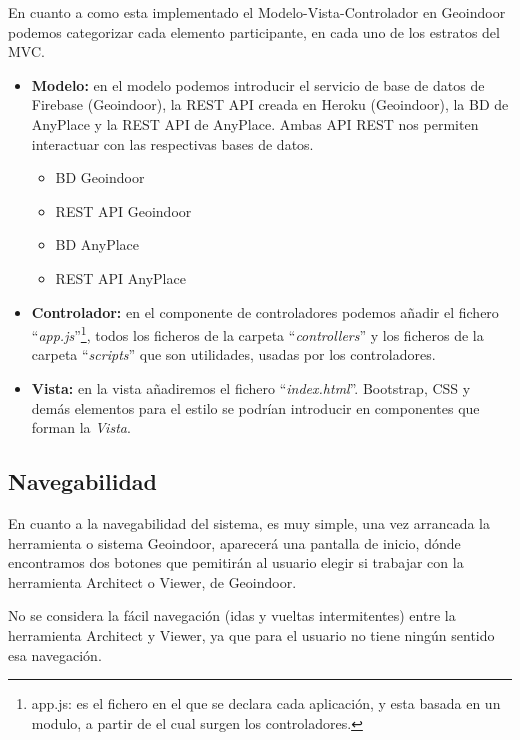 En cuanto a como esta implementado el Modelo-Vista-Controlador en Geoindoor podemos categorizar cada elemento participante, en cada uno de los estratos del MVC.

\begin{itemize}
	\item \textbf{Modelo:} en el modelo podemos introducir el servicio de base de datos de Firebase (Geoindoor), la REST API creada en Heroku (Geoindoor), la BD de AnyPlace y la REST API de AnyPlace. Ambas API REST nos permiten interactuar con las respectivas bases de datos.
	\begin{itemize}
		\item BD Geoindoor
		\item REST API Geoindoor 
		\item BD AnyPlace
		\item REST API AnyPlace 
	\end{itemize}
	\item \textbf{Controlador:} en el componente de controladores podemos añadir el fichero ``\textit{app.js}''\footnote{app.js: es el fichero en el que se declara cada aplicación, y esta basada en un modulo, a partir de el cual surgen los controladores.}, todos los ficheros de la carpeta ``\textit{controllers}'' y los ficheros de la carpeta  ``\textit{scripts}'' que son utilidades, usadas por los controladores.
	\item \textbf{Vista:} en la vista añadiremos el fichero ``\textit{index.html}''. Bootstrap, CSS y demás elementos para el estilo se podrían introducir en componentes que forman la \textit{Vista}.
\end{itemize}



\subsection{Navegabilidad}

En cuanto a la navegabilidad del sistema, es muy simple, una vez arrancada la herramienta o sistema Geoindoor, aparecerá una pantalla de inicio, dónde encontramos dos botones que pemitirán al usuario elegir si trabajar con la herramienta Architect o Viewer, de Geoindoor. 


No se considera la fácil navegación (idas y vueltas intermitentes) entre la herramienta Architect y Viewer, ya que para el usuario no tiene ningún sentido esa navegación. 